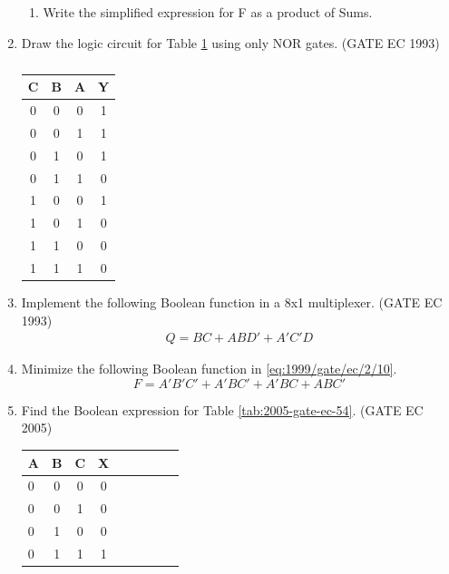 \begin{enumerate}
\begin{enumerate}
\item Write the simplified expression for F as a product of Sums.
\end{enumerate}
\item Draw the logic circuit for Table 
\ref{tab:1993/gate/ec/5/7} using only NOR gates.
\label{prob:1993/gate/ec/5/7}
\hfill (GATE EC 1993)
	\begin{table}[!ht]
		\centering
		\begin{tabular}{|c|c|c|c|}
\hline
\textbf{C} &\textbf{B} & \textbf{A} & \textbf{Y} \\
\hline
0 & 0 & 0 & 1 \\  
\hline
0 & 0 & 1 & 1 \\ 
\hline
0 & 1 & 0 & 1 \\
\hline
0 & 1 & 1 & 0 \\
\hline
1 & 0 & 0 & 1 \\  
\hline
1 & 0 & 1 & 0 \\ 
\hline
1 & 1 & 0 & 0 \\
\hline
1 & 1 & 1& 0\\
\hline
\end{tabular}
\caption{}
\label{tab:1993/gate/ec/5/7}
\end{table}
\item
	Implement the following Boolean function in a 8x1 multiplexer.
\label{prob:1993/gate/ec/14}
\hfill (GATE EC 1993)
		\begin{align}
\label{eq:1993/gate/ec/14}
 Q = BC + ABD' + A'C'D  
		\end{align}
	\item Minimize the following Boolean function in 
\ref{eq:1999/gate/ec/2/10}.
\label{prob:1999/gate/ec/2/10}
		\begin{equation}
\label{eq:1999/gate/ec/2/10}
F= A'B'C'+A'BC'+A'BC+ABC'
\end{equation}
%
\item Find the Boolean expression for Table
\ref{tab:2005-gate-ec-54}.
\label{prob:2005-gate-ec-54}
\hfill (GATE EC 2005)
	\begin{table}[htbp]
		\centering
    \begin{tabular}{|l|c|c|c|c|c|c|c|c} \hline \textbf{A}
  & \textbf{B} & \textbf{C} & \textbf{X} \\
 \hline
        0&0&0&0 \\
        \hline
        0&0&1&0 \\
        \hline
        0&1&0&0 \\
        \hline
        0&1&1&1 \\

\end{tabular}
\end{table}
\end{enumerate}
